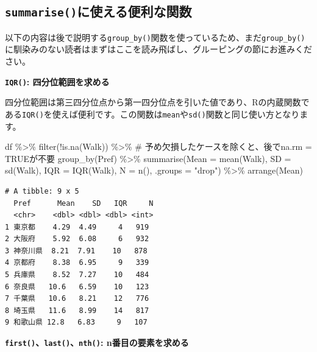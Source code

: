 \documentclass[
  a4paper,
  pandoc,
  ja=standard,
  jafont=haranoaji]{bxjsbook}
\newenvironment{Shaded}{\begin{snugshade}}{\end{snugshade}}
\newcommand{\AttributeTok}[1]{\textcolor[rgb]{0.00,0.48,0.65}{#1}}
\newcommand{\CommentTok}[1]{\textcolor[rgb]{0.37,0.37,0.37}{#1}}
\newcommand{\FunctionTok}[1]{\textcolor[rgb]{0.28,0.35,0.67}{#1}}
\newcommand{\NormalTok}[1]{\textcolor[rgb]{0.00,0.48,0.65}{#1}}
\newcommand{\SpecialCharTok}[1]{\textcolor[rgb]{0.37,0.37,0.37}{#1}}
\newcommand{\StringTok}[1]{\textcolor[rgb]{0.13,0.47,0.30}{#1}}
\begin{document}
\hypertarget{summariseux306bux4f7fux3048ux308bux4fbfux5229ux306aux95a2ux6570}{%
\subsection{\texorpdfstring{\texttt{summarise()}に使える便利な関数}{summarise()に使える便利な関数}}\label{summariseux306bux4f7fux3048ux308bux4fbfux5229ux306aux95a2ux6570}}

以下の内容は後で説明する\texttt{group\_by()}関数を使っているため、まだ\texttt{group\_by()}に馴染みのない読者はまずはここを読み飛ばし、グルーピングの節にお進みください。

\textbf{\texttt{IQR()}: 四分位範囲を求める}

四分位範囲は第三四分位点から第一四分位点を引いた値であり、Rの内蔵関数である\texttt{IQR()}を使えば便利です。この関数は\texttt{mean}や\texttt{sd()}関数と同じ使い方となります。

\begin{Shaded}
\begin{Highlighting}[numbers=left,,]
\NormalTok{df }\SpecialCharTok{\%\textgreater{}\%}
  \FunctionTok{filter}\NormalTok{(}\SpecialCharTok{!}\FunctionTok{is.na}\NormalTok{(Walk)) }\SpecialCharTok{\%\textgreater{}\%} \CommentTok{\# 予め欠損したケースを除くと、後でna.rm = TRUEが不要}
  \FunctionTok{group\_by}\NormalTok{(Pref) }\SpecialCharTok{\%\textgreater{}\%}
  \FunctionTok{summarise}\NormalTok{(}\AttributeTok{Mean    =} \FunctionTok{mean}\NormalTok{(Walk),}
            \AttributeTok{SD      =} \FunctionTok{sd}\NormalTok{(Walk),}
            \AttributeTok{IQR     =} \FunctionTok{IQR}\NormalTok{(Walk),}
            \AttributeTok{N       =} \FunctionTok{n}\NormalTok{(),}
            \AttributeTok{.groups =} \StringTok{"drop"}\NormalTok{) }\SpecialCharTok{\%\textgreater{}\%}
  \FunctionTok{arrange}\NormalTok{(Mean)}
\end{Highlighting}
\end{Shaded}

\begin{verbatim}
# A tibble: 9 x 5
  Pref      Mean    SD   IQR     N
  <chr>    <dbl> <dbl> <dbl> <int>
1 東京都    4.29  4.49     4   919
2 大阪府    5.92  6.08     6   932
3 神奈川県  8.21  7.91    10   878
4 京都府    8.38  6.95     9   339
5 兵庫県    8.52  7.27    10   484
6 奈良県   10.6   6.59    10   123
7 千葉県   10.6   8.21    12   776
8 埼玉県   11.6   8.99    14   817
9 和歌山県 12.8   6.83     9   107
\end{verbatim}

\textbf{\texttt{first()}、\texttt{last()}、\texttt{nth()}:
n番目の要素を求める}
\end{document}
